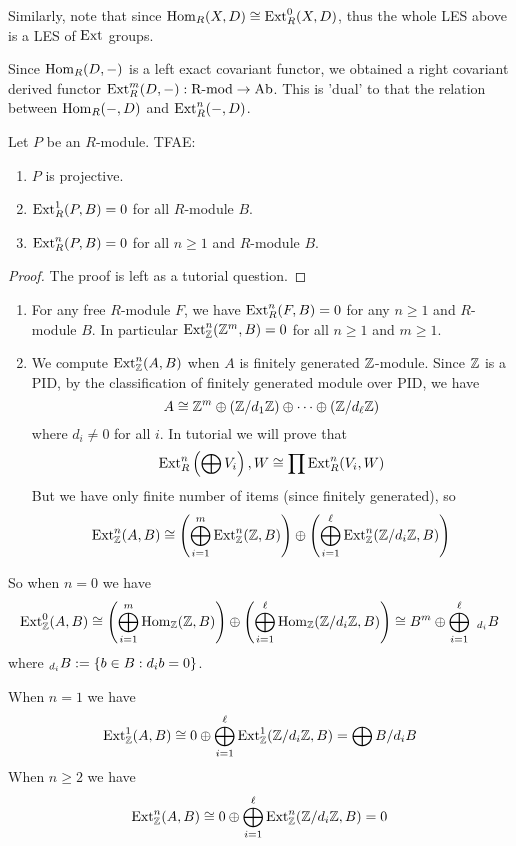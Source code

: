 \begin{re}
    Similarly, note that since $\operatorname{Hom}_R(X,D)\cong \operatorname{Ext}_R^0(X,D)$, thus the whole LES above is a LES of $\operatorname{Ext}$ groups.
\end{re}

\medskip

\begin{re}
    Since $\operatorname{Hom}_R(D,-)$ is a left exact covariant functor, we obtained a right covariant derived functor $\operatorname{Ext}_R^m(D,-):\text{R-mod} \to \text{Ab}$. This is 'dual' to that the relation between $\operatorname{Hom}_R(-,D)$ and $\operatorname{Ext}_R^n(-,D)$.
\end{re}

\medskip

\begin{thm}
    Let $P$ be an $R$-module. TFAE:
    \begin{enumerate}
        \item $P$ is projective.
        \item $\operatorname{Ext}_R^1(P,B)=0$ for all $R$-module $B$.
        \item $\operatorname{Ext}_R^n(P,B)=0$ for all $n\geq 1$ and $R$-module $B$.
    \end{enumerate}
\end{thm}
\begin{proof}
    The proof is left as a tutorial question.
\end{proof}

\begin{ex}
    \hfill
    
    \begin{enumerate}
        \item For any free $R$-module $F$, we have $\operatorname{Ext}_R^n(F,B)=0$ for any $n\geq 1$ and $R$-module $B$. In particular $\operatorname{Ext}_{\mathbb Z}^n({\mathbb Z}^m,B)=0$ for all $n\geq 1$ and $m\geq 1$.
        \item We compute $\operatorname{Ext}_{\mathbb Z}^n(A,B)$ when $A$ is finitely generated ${\mathbb Z}$-module. Since ${\mathbb Z}$ is a PID, by the classification of finitely generated module over PID, we have 
        \[A\cong {\mathbb Z}^m \oplus ({\mathbb Z}/d_1{\mathbb Z}) \oplus \dots \oplus ({\mathbb Z}/d_\ell {\mathbb Z}) \]
        where $d_i\neq 0 $ for all $i$. In tutorial we will prove that
        \[\operatorname{Ext}_R^n\left(\bigoplus V_i\right), W\cong \prod \operatorname{Ext}_R^n(V_i, W)\]
        But we have only finite number of items (since finitely generated), so 
        \[\operatorname{Ext}_{\mathbb Z}^n(A,B)\cong \left(\bigoplus_{i=1}^m \operatorname{Ext}_{\mathbb Z}^n({\mathbb Z},B)\right) \oplus \left(\bigoplus_{i=1}^\ell\operatorname{Ext}_{\mathbb Z}^n({\mathbb Z}/d_i{\mathbb Z}, B)\right)\]
    \end{enumerate}
    So when $n=0$ we have
    \[\operatorname{Ext}_{\mathbb Z}^0(A,B) \cong \left(\bigoplus_{i=1}^m \operatorname{Hom}_{\mathbb Z}({\mathbb Z},B)\right) \oplus \left(\bigoplus_{i=1}^\ell\operatorname{Hom}_{\mathbb Z}({\mathbb Z}/d_i{\mathbb Z}, B)\right)\cong B^m \oplus  \bigoplus_{i=1}^\ell\ _{d_i}B\]
    where $_{d_i}B:= \left\{b\in B : d_i b = 0\right\}$.

    When $n=1$ we have
    \[\operatorname{Ext}_{\mathbb Z}^1(A,B) \cong 0 \oplus \bigoplus_{i=1}^\ell \operatorname{Ext}_{\mathbb Z}^1 ({\mathbb Z}/d_i{\mathbb Z}, B) = \bigoplus B/d_i B\]
    When $n\geq 2$ we have 
    \[\operatorname{Ext}_{\mathbb Z}^n(A,B)\cong 0 \oplus \bigoplus_{i=1}^\ell \operatorname{Ext}_{\mathbb Z}^n({\mathbb Z}/d_i{\mathbb Z}, B) = 0\]
\end{ex}

